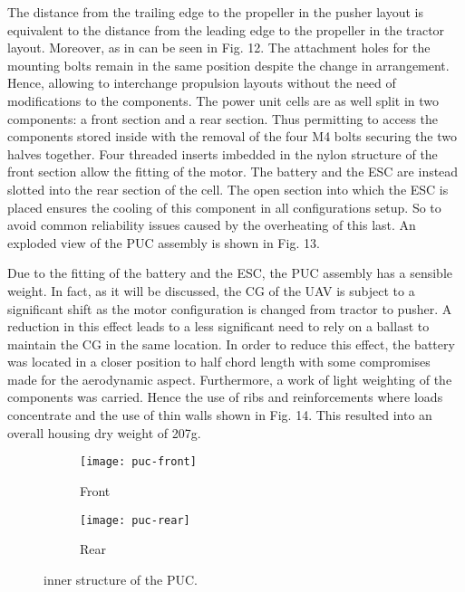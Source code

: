\documentclass[../../main.tex]{subfiles}
\begin{document}
The distance from the trailing edge to the propeller in the pusher layout is equivalent to the distance from the leading edge to the propeller in the tractor layout.
Moreover, as in can be seen in Fig. 12.
The attachment holes for the mounting bolts remain in the same position despite the change in arrangement.
Hence, allowing to interchange propulsion layouts without the need of modifications to the components. 
The power unit cells are as well split in two components: a front section and a rear section.
Thus permitting to access the components stored inside with the removal of the four M4 bolts securing the two halves together.
Four threaded inserts imbedded in the nylon structure of the front section allow the fitting of the motor.
The battery and the ESC are instead slotted into the rear section of the cell.
The open section into which the ESC is placed ensures the cooling of this component in all configurations setup.
So to avoid common reliability issues caused by the overheating of this last.
An exploded view of the PUC assembly is shown in Fig. 13. 


Due to the fitting of the battery and the ESC, the PUC assembly has a sensible weight.
In fact, as it will be discussed, the CG of the UAV is subject to a significant shift as the motor configuration is changed from tractor to pusher.
A reduction in this effect leads to a less significant need to rely on a ballast to maintain the CG in the same location. 
In order to reduce this effect, the battery was located in a closer position to half chord length with some compromises made for the aerodynamic aspect.
Furthermore, a work of light weighting of the components was carried.
Hence the use of ribs and reinforcements where loads concentrate and the use of thin walls shown in Fig. 14.
This resulted into an overall housing dry weight of 207g. 


\begin{figure}[H]
    \centering
    \begin{subfigure}[b]{0.4\columnwidth}
        \centering
        \texttt{[image: puc-front]}
        \caption{Front}
        \label{fig:puc-design:front}
    \end{subfigure}
    \hfill
    \begin{subfigure}[b]{0.4\columnwidth}
        \centering
        \texttt{[image: puc-rear]}
        \caption{Rear}
        \label{fig:puc-design:rear}
    \end{subfigure}
    
    \caption{inner structure of the PUC.}
    \label{fig:puc-design}
\end{figure} 

\end{document}
